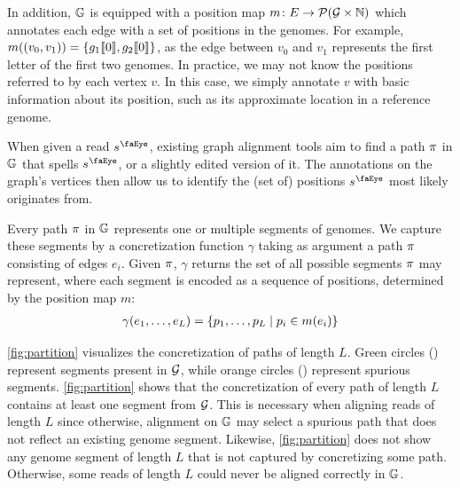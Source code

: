 In addition, $\mathbb{G}$ is equipped with a position map $m \colon E \to \mathcal{P}(\mathcal{G} \times \mathbb{N})$ which annotates each edge with a set of positions in the genomes.
For example, $m((v_0,v_1))=\{g_1\llbracket 0 \rrbracket,g_2\llbracket 0 \rrbracket\}$, as the edge between $v_0$ and $v_1$ represents the first letter of the first two genomes.
In practice, we may not know the positions referred to by each vertex $v$.
In this case, we simply annotate $v$ with basic information about its position,
such as its approximate location in a reference genome.

When given a read $\segment^\gread$, existing graph alignment tools aim to find a path $\pi$ in $\mathbb{G}$ that spells $\segment^\gread$, or a slightly edited version of it.
The annotations on the graph's vertices then allow us to identify the (set of) positions $\segment^\gread$ most likely originates from.

Every path $\pi$ in $\mathbb{G}$ represents one or multiple segments of genomes.
We capture these segments by a concretization function $\gamma$ taking as argument a path $\pi$ consisting of edges $e_i$.
Given $\pi$, $\gamma$ returns the set of all possible segments $\pi$ may represent, where each segment is encoded as a sequence of positions, determined by the position map $m$:
\begin{align*}
	\gamma(e_1, \dots, e_L) = \{p_1, \dots, p_L \mid p_i \in m(e_i)\}
\end{align*}

\cref{fig:partition} visualizes the concretization of paths of length $L$.
Green circles () represent segments present in $\mathcal{G}$, while orange circles () represent spurious segments.
\cref{fig:partition} shows that the concretization of every path of length $L$ contains at least one segment from $\mathcal{G}$.
This is necessary when aligning reads of length $L$ since otherwise, alignment on $\mathbb{G}$ may select a spurious path that does not reflect an existing genome segment.
Likewise, \cref{fig:partition} does not show any genome segment of length $L$ that is not captured by concretizing some path.
Otherwise, some reads of length $L$ could never be aligned correctly in $\mathbb{G}$.

